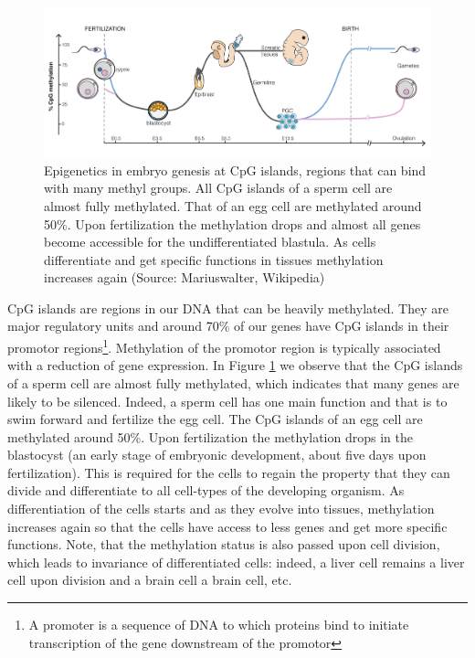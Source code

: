 \documentclass[
  11pt,
]{book}
\begin{document}
\begin{figure}

{\centering \includegraphics[width=1\linewidth]{./figs/DNA_methylation_reprogramming} 

}

\caption{Epigenetics in embryo genesis at CpG islands, regions that can bind with many methyl groups. All CpG islands of a sperm cell are almost fully methylated. That of an egg cell are methylated around 50\%. Upon fertilization the methylation drops and almost all genes become accessible for the undifferentiated blastula. As cells differentiate and get specific functions in tissues methylation increases again (Source: Mariuswalter, Wikipedia)}\label{fig:epiEmbryo}
\end{figure}

CpG islands are regions in our DNA that can be heavily methylated. They are major regulatory units and around 70\% of our genes have CpG islands in their promotor regions\footnote{A promoter is a sequence of DNA to which proteins bind to initiate transcription of the gene downstream of the promotor}. Methylation of the promotor region is typically associated with a reduction of gene expression. In Figure \ref{fig:epiEmbryo} we observe that the CpG islands of a sperm cell are almost fully methylated, which indicates that many genes are likely to be silenced. Indeed, a sperm cell has one main function and that is to swim forward and fertilize the egg cell. The CpG islands of an egg cell are methylated around 50\%. Upon fertilization the methylation drops in the blastocyst (an early stage of embryonic development, about five days upon fertilization). This is required for the cells to regain the property that they can divide and differentiate to all cell-types of the developing organism. As differentiation of the cells starts and as they evolve into tissues, methylation increases again so that the cells have access to less genes and get more specific functions. Note, that the methylation status is also passed upon cell division, which leads to invariance of differentiated cells: indeed, a liver cell remains a liver cell upon division and a brain cell a brain cell, etc.
\end{document}
